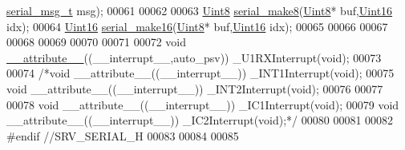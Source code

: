 \begin{DoxyCode}
      \hyperlink{a00031_d3/d4f/a00761}{serial\_msg\_t} msg);
00061 
00062 
00063 \hyperlink{a00072_af84840501dec18061d18a68c162a8fa2}{Uint8}              \hyperlink{a00031_aa76f5237babd71f1484bb2dbc6aa0f8d}{serial\_make8}(\hyperlink{a00072_af84840501dec18061d18a68c162a8fa2}{Uint8}* buf,\hyperlink{a00072_a59a9f6be4562c327cbfb4f7e8e18f08b}{Uint16} idx);
00064 \hyperlink{a00072_a59a9f6be4562c327cbfb4f7e8e18f08b}{Uint16}            \hyperlink{a00031_abc17de32f14103a5be219df0d4ad9176}{serial\_make16}(\hyperlink{a00072_af84840501dec18061d18a68c162a8fa2}{Uint8}* buf,\hyperlink{a00072_a59a9f6be4562c327cbfb4f7e8e18f08b}{Uint16} idx);
00065 
00066 
00067 
00068 
00069 
00070 
00071 
00072 \textcolor{keywordtype}{void} \hyperlink{a00031_af419298e8d3acbb31667796fec870f76}{\_\_attribute\_\_}((\_\_interrupt\_\_,auto\_psv)) \_U1RXInterrupt(\textcolor{keywordtype}{void});
00073 
00074 \textcolor{comment}{/*void \_\_attribute\_\_((\_\_interrupt\_\_)) \_INT1Interrupt(void);}
00075 \textcolor{comment}{void \_\_attribute\_\_((\_\_interrupt\_\_)) \_INT2Interrupt(void);}
00076 \textcolor{comment}{}
00077 \textcolor{comment}{}
00078 \textcolor{comment}{void \_\_attribute\_\_((\_\_interrupt\_\_)) \_IC1Interrupt(void);}
00079 \textcolor{comment}{void \_\_attribute\_\_((\_\_interrupt\_\_)) \_IC2Interrupt(void);*/}
00080 
00081 
00082 \textcolor{preprocessor}{#endif //SRV\_SERIAL\_H}
00083 
00084 
00085 
\end{DoxyCode}

